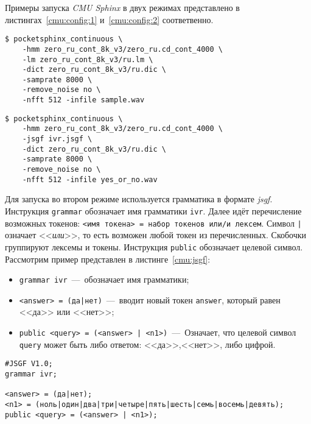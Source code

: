 Примеры запуска \textit{CMU Sphinx} в двух режимах представлено в
листингах~\ref{cmu:config:1} и~\ref{cmu:config:2} соответвенно.\\

\begin{lstlisting}[caption={Запуск \textit{CMU Sphinx}. Вариант 1},label={cmu:config:1}]
$ pocketsphinx_continuous \
    -hmm zero_ru_cont_8k_v3/zero_ru.cd_cont_4000 \
    -lm zero_ru_cont_8k_v3/ru.lm \
    -dict zero_ru_cont_8k_v3/ru.dic \
    -samprate 8000 \
    -remove_noise no \
    -nfft 512 -infile sample.wav
\end{lstlisting}

\begin{lstlisting}[caption={Запуск \textit{CMU Sphinx}. Вариант 2},label={cmu:config:2}]
$ pocketsphinx_continuous \
    -hmm zero_ru_cont_8k_v3/zero_ru.cd_cont_4000 \
    -jsgf ivr.jsgf \
    -dict zero_ru_cont_8k_v3/ru.dic \
    -samprate 8000 \
    -remove_noise no \
    -nfft 512 -infile yes_or_no.wav
\end{lstlisting}

Для запуска во втором режиме используется грамматика в формате \textit{jsgf}.
Инструкция \texttt{grammar} обозначает имя грамматики \texttt{ivr}. Далее
идёт перечисление возможных токенов: \texttt{<имя токена> = набор токенов или/и лексем}.
Символ \texttt{|} означает <<\textit{или}>>, то есть возможен любой токен из перечисленных.
Скобочки группируют лексемы и токены. Инструкция \texttt{public} обозначает целевой символ.
Рассмотрим пример представлен в листинге~\ref{cmu:jsgf}:

\begin{itemize}
    \item \texttt{grammar ivr}~---~обозначает имя грамматики;
    \item \texttt{<answer> = (да|нет)}~---~вводит новый токен \texttt{answer},
    который равен <<да>> или <<нет>>;
    \item \texttt{public <query> = (<answer> | <n1>)}~---~Означает, что целевой
        символ \texttt{query} может быть либо ответом: <<да>>,<<нет>>, либо цифрой.
\end{itemize}


\begin{minipage}{\linewidth}
\captionof{lstlisting}{Пример грамматики}\label{cmu:jsgf}
\begin{Verbatim}[fontsize=\footnotesize]
#JSGF V1.0;
grammar ivr;

<answer> = (да|нет);
<n1> = (ноль|один|два|три|четыре|пять|шесть|семь|восемь|девять);
public <query> = (<answer> | <n1>);

\end{Verbatim}
\end{minipage}

